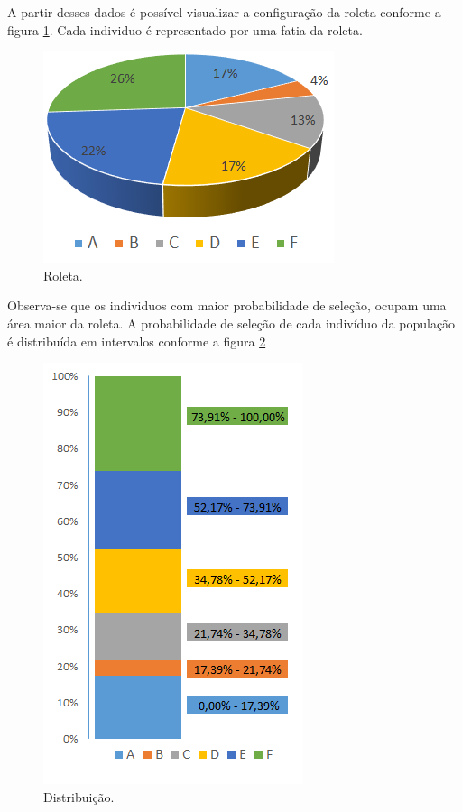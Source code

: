 \documentclass[twoside]{article}
\begin{document}
\begin{multicols}{2}
A partir desses dados é possível visualizar a configuração da roleta conforme a figura \ref{fig:roleta}. Cada individuo é representado por uma fatia da roleta.

\begin{figure}[H]
\label{fig:roleta}
  \caption{Roleta.}
  \centering
    \includegraphics[scale = 0.8]{roleta.png}
\end{figure}

Observa-se que os individuos com maior probabilidade de seleção, ocupam uma área maior da roleta. A probabilidade de seleção de cada indivíduo da população é distribuída em intervalos conforme a figura \ref{fig:ditrib}

\begin{figure}[H]
\label{fig:ditrib}
  \caption{Distribuição.}
  \centering
    \includegraphics[scale = .8]{roleta_dist2.png}
\end{figure}


\end{multicols}
\end{document}
